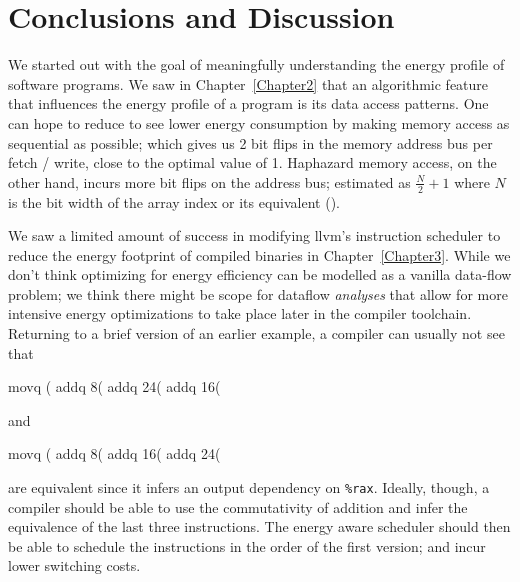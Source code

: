 \chapter{Conclusions and Discussion}

\label{Chapter4}


We started out with the goal of meaningfully understanding the energy
profile of software programs.  We saw in Chapter~\ref{Chapter2} that
an algorithmic feature that influences the energy profile of a program
is its data access patterns.  One can hope to reduce to see lower
energy consumption by making memory access as sequential as possible;
which gives us 2 bit flips in the memory address bus per fetch /
write, close to the optimal value of 1.  Haphazard memory access, on
the other hand, incurs more bit flips on the address bus; estimated as
$\frac{N}{2} + 1$ where $N$ is the bit width of the array index or its
equivalent ().

We saw a limited amount of success in modifying llvm's instruction
scheduler to reduce the energy footprint of compiled binaries in
Chapter~\ref{Chapter3}.  While we don't think optimizing for energy
efficiency can be modelled as a vanilla data-flow problem; we think
there might be scope for dataflow \textit{analyses} that allow for
more intensive energy optimizations to take place later in the
compiler toolchain.  Returning to a brief version of an earlier
example, a compiler can usually not see that

\begin{gascode}
  movq    (%
  addq    8(%
  addq    24(%
  addq    16(%
\end{gascode}

and

\begin{gascode}
  movq    (%
  addq    8(%
  addq    16(%
  addq    24(%
\end{gascode}

are equivalent since it infers an output dependency on \texttt{\%rax}.
Ideally, though, a compiler should be able to use the commutativity of
addition and infer the equivalence of the last three instructions.
The energy aware scheduler should then be able to schedule the
instructions in the order of the first version; and incur lower
switching costs.
